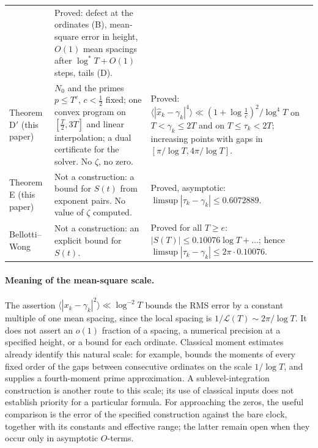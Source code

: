\documentclass[preprint,12pt]{elsarticle}
\numberwithin{equation}{section}
\theoremstyle{plain}
\theoremstyle{definition}
\theoremstyle{remark}
\newcommand{\NO}{N_0}
\newcommand{\lL}{\mathcal L}
\begin{document}
\begin{longtable}{@{}p{}p{}p{}@{}}
& Proved: defect at the ordinates (B), mean-square error in height, $O(1)$ mean spacings after $\log^*T+O(1)$ steps, tails (D).\\
Theorem D$'$ (this paper)
& $\NO$ and the primes $p\le T^c$, $c<\frac12$ fixed; one convex program on $[\frac T2,3T]$ and linear interpolation; a dual certificate for the solver. No $\zeta$, no zero.
& Proved: $\langle|\widehat x_k-\gamma_k|^4\rangle\ll(1+\log\frac1c)^2/\log^4T$ on $T<\gamma_k\le2T$ and on $T\le\tau_k<2T$; increasing points with gaps in $[\pi/\log T,4\pi/\log T]$.\\
Theorem E (this paper)
& Not a construction: a bound for $S(t)$ from exponent pairs. No value of $\zeta$ computed.
& Proved, asymptotic: $\limsup|\tau_k-\gamma_k|\le0.6072889$.\\
Bellotti--Wong \cite{BellottiWong2025}
& Not a construction: an explicit bound for $S(t)$.
& Proved for all $T\ge e$: $|S(T)|\le0.10076\log T+\ldots$; hence $\limsup|\tau_k-\gamma_k|\le2\pi\cdot0.10076$.\\
\end{longtable}
\endgroup

\paragraph{Meaning of the mean-square scale.}\label{par:meansquare_scope}
The assertion $\langle|x_k-\gamma_k|^2\rangle\ll\log^{-2}T$ bounds the RMS error by a constant multiple of one mean spacing, since the local spacing is $1/\lL(T)\sim2\pi/\log T$. It does not assert an $o(1)$ fraction of a spacing, a numerical precision at a specified height, or a bound for each ordinate. Classical moment estimates already identify this natural scale: for example, \cite[\S9.25, (9.25.4)]{Titchmarsh1986} bounds the moments of every fixed order of the gaps between consecutive ordinates on the scale $1/\log T$, and \cite[(3.6)]{FazzariGerspachMinelli2025} supplies a fourth-moment prime approximation. A sublevel-integration construction is another route to this scale; its use of classical inputs does not establish priority for a particular formula. For approaching the zeros, the useful comparison is the error of the specified construction against the bare clock, together with its constants and effective range; the latter remain open when they occur only in asymptotic $O$-terms.
\end{document}
